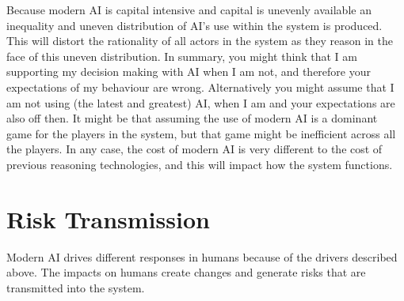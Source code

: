 \documentclass[11pt]{article}
\begin{document}
Because modern AI is capital intensive and capital is unevenly available an inequality and uneven distribution of AI's use within the system is produced. This will distort the rationality of all actors in the system as they reason in the face of this uneven distribution. In summary, you might think that I am supporting my decision making with AI when I am not, and therefore your expectations of my behaviour are wrong. Alternatively you might assume that I am not using (the latest and greatest) AI, when I am and your expectations are also off then. It might be that assuming the use of modern AI is a dominant game for the players in the system, but that game might be inefficient across all the players. In any case, the cost of modern AI is very different to the cost of previous reasoning technologies, and this will impact how the system functions.

\section{Risk Transmission} \label{sec:transmission}

Modern AI drives different responses in humans because of the drivers described above. The impacts on humans create changes and generate risks that are transmitted into the system. 
\end{document}
